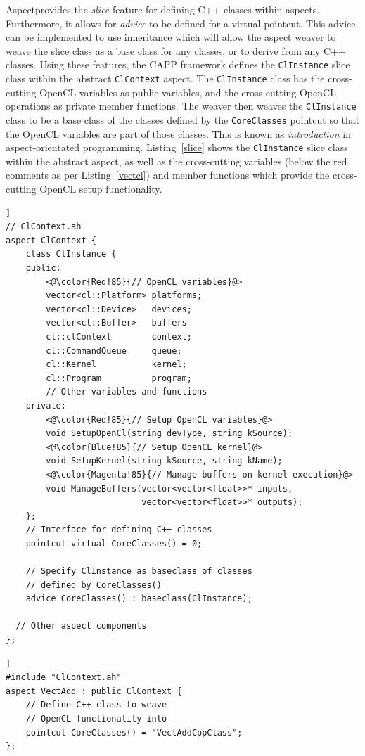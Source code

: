\documentclass{sig-alternate-05-2015}
\begin{document}
Aspect\CPP provides the \textit{slice} feature for defining C++ classes within
aspects. Furthermore, it allows for \textit{advice} to be defined for a 
virtual pointcut. This advice can be implemented to use \CPP inheritance which
will allow the aspect weaver to weave the slice class as a base class for 
any \CPP classes, or to derive from any C++ classes. Using these features, the  CAPP framework defines the 
\lstinline$ClInstance$ slice class within the abstract \lstinline$ClContext$ aspect.  
The \lstinline$ClInstance$ class has the cross-cutting OpenCL variables as public
variables, and the cross-cutting OpenCL operations as private member functions.
The weaver then weaves the \lstinline$ClInstance$ class to be a base class of the \CPP
classes defined by the \lstinline$CoreClasses$ pointcut so that the OpenCL variables 
are part of those \CPP classes. This is known as \textit{introduction} in
aspect-orientated programming.
Listing~\ref{slice} shows the \lstinline$ClInstance$ slice class within the abstract aspect,
as well as the cross-cutting variables (below the red comments as per 
Listing~\ref{vectcl}) and member functions which provide the cross-cutting
OpenCL setup functionality.

\begin{lstlisting}[caption=Abstract ClContext aspect which defines the OpenCL variables
required for parallel programming.,label=slice,float=[!t]]
// ClContext.ah
aspect ClContext {
	class ClInstance {
	public:
		<@\color{Red!85}{// OpenCL variables}@>
		vector<cl::Platform> platforms;
		vector<cl::Device>   devices;
		vector<cl::Buffer>   buffers
		cl::clContext        context;
		cl::CommandQueue     queue;
		cl::Kernel           kernel;
		cl::Program          program;
		// Other variables and functions 
	private:
		<@\color{Red!85}{// Setup OpenCL variables}@>
		void SetupOpenCl(string devType, string kSource);
		<@\color{Blue!85}{// Setup OpenCL kernel}@>
		void SetupKernel(string kSource, string kName);
		<@\color{Magenta!85}{// Manage buffers on kernel execution}@>
		void ManageBuffers(vector<vector<float>>* inputs,
		                   vector<vector<float>>* outputs);
	};
	// Interface for defining C++ classes
	pointcut virtual CoreClasses() = 0;

	// Specify ClInstance as baseclass of classes
	// defined by CoreClasses()
	advice CoreClasses() : baseclass(ClInstance);

  // Other aspect components
};
\end{lstlisting}

\begin{lstlisting}[caption=Derived aspect defining a \CPP class into which the OpenCL 
	functionality should be woven.,label=dslice,float=[!t]]
#include "ClContext.ah"
aspect VectAdd : public ClContext {
	// Define C++ class to weave
	// OpenCL functionality into
	pointcut CoreClasses() = "VectAddCppClass";
};
\end{lstlisting}
\end{document}
